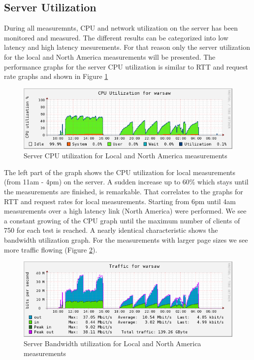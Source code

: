 \subsection{Server Utilization}
\label{subsec:server_util}

During all measuremnts, CPU and network utilization on the server has been monitored and measured. The different results can be categorized into low latency and high latency mesurements. For that reason only the server utilization for the local and North America measurements will be presented. The performance graphs for the server CPU utilization is similar to RTT and request rate graphs and shown in Figure \ref{fig:cpu}   

\begin{figure}[H]
\centering
\includegraphics[scale=0.6,trim=0.0cm .0cm .0cm .0cm,clip]{images/cpu.png}
\caption{Server CPU utilization for Local and North America measurements}
\label{fig:cpu}
\end{figure}

The left part of the graph shows the CPU utilization for local measurements (from 11am - 4pm) on the server. A sudden increase up to 60\% which stays until the measurements are finished, is remarkable. That correlates to the graphs for RTT and request rates for local measurements. Starting from 6pm until 4am measurements over a high latency link (North America) were performed. We see a constant growing of the CPU graph until the maximum number of clients of 750 for each test is reached. A nearly identical characteristic shows the bandwidth utilization graph. For the measurements with larger page sizes we see more traffic flowing (Figure \ref{fig:network}).

\begin{figure}[H]
\centering
\includegraphics[scale=0.6,trim=0.0cm .0cm .0cm .0cm,clip]{images/network.png}
\caption{Server Bandwidth utilization for Local and North America measurements}
\label{fig:network}
\end{figure}

